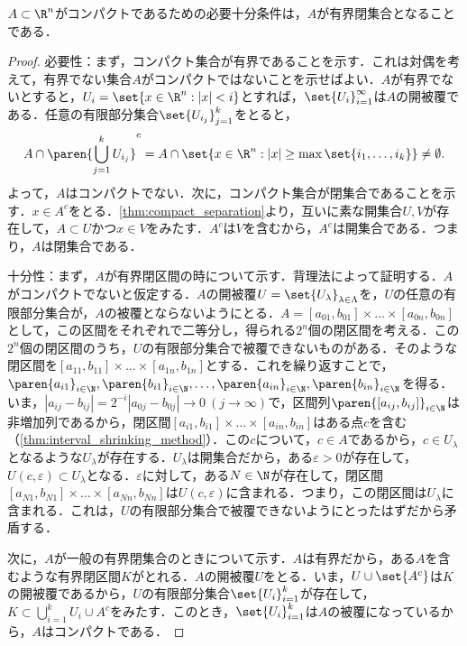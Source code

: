 \documentclass[a4paper,10pt]{ltjsarticle}
\begin{document}
\begin{MyTheorem}
  \(A \subset \R^n\)がコンパクトであるための必要十分条件は，\(A\)が有界閉集合となることである．
\end{MyTheorem}
\begin{proof}
  必要性：まず，コンパクト集合が有界であることを示す．これは対偶を考えて，有界でない集合\(A\)がコンパクトではないことを示せばよい．\(A\)が有界でないとすると，\(U_i = \set{x \in \R^n : |x| < i}\)とすれば，\(\set{U_i}_{i=1}^\infty\)は\(A\)の開被覆である．任意の有限部分集合\(\set{U_{i_j}}_{j=1}^k\)をとると，
  \[ A \cap \paren{\bigcup_{j=1}^k U_{i_j}}^c = A \cap \set{x \in \R^n : |x| \ge \max\set{i_1, \dots, i_k}} \ne \emptyset. \]
  よって，\(A\)はコンパクトでない．次に，コンパクト集合が閉集合であることを示す．\(x \in A^c\)をとる．\cref{thm:compact_separation}より，互いに素な開集合\(U, V\)が存在して，\(A \subset U\)かつ\(x \in V\)をみたす．\(A^c\)は\(V\)を含むから，\(A^c\)は開集合である．つまり，\(A\)は閉集合である．

  十分性：まず，\(A\)が有界閉区間の時について示す．背理法によって証明する．\(A\)がコンパクトでないと仮定する．\(A\)の開被覆\(U = \set{U_\lambda}_{\lambda \in \Lambda}\)を，\(U\)の任意の有限部分集合が，\(A\)の被覆とならないようにとる．\(A = [a_{01}, b_{01}] \times \dots \times [a_{0n}, b_{0n}]\)として，この区間をそれぞれで二等分し，得られる\(2^n\)個の閉区間を考える．この\(2^n\)個の閉区間のうち，\(U\)の有限部分集合で被覆できないものがある．そのような閉区間を\([a_{11}, b_{11}] \times \dots \times [a_{1n}, b_{1n}]\)とする．これを繰り返すことで，\(\paren{a_{i1}}_{i\in\N}, \paren{b_{i1}}_{i\in\N}, \dots, \paren{a_{in}}_{i\in\N}, \paren{b_{in}}_{i\in\N}\)を得る．いま，\(|a_{ij}-b_{ij}| = 2^{-i}|a_{0j}-b_{0j}| \to 0 \ (j \to \infty)\)で，区間列\(\paren{[a_{ij}, b_{ij}]}_{i\in\N}\)は非増加列であるから，閉区間\([a_{i1}, b_{i1}] \times \dots \times [a_{in}, b_{in}]\)はある点\(c\)を含む（\cref{thm:interval_shrinking_method}）．この\(c\)について，\(c \in A\)であるから，\(c \in U_\lambda\)となるような\(U_\lambda\)が存在する．\(U_\lambda\)は開集合だから，ある\(\varepsilon > 0\)が存在して，\( U(c, \varepsilon) \subset U_\lambda\)となる．\(\varepsilon\)に対して，ある\(N \in \N\)が存在して，閉区間\([a_{N1}, b_{N1}] \times \dots \times [a_{Nn}, b_{Nn}]\)は\(U(c, \varepsilon)\)に含まれる．つまり，この閉区間は\(U_\lambda\)に含まれる．これは，\(U\)の有限部分集合で被覆できないようにとったはずだから矛盾する．

  次に，\(A\)が一般の有界閉集合のときについて示す．\(A\)は有界だから，ある\(A\)を含むような有界閉区間\(K\)がとれる．\(A\)の開被覆\(U\)をとる．いま，\(U \cup \set{A^c}\)は\(K\)の開被覆であるから，\(U\)の有限部分集合\(\set{U_i}_{i=1}^k\)が存在して，\(K \subset \bigcup_{i=1}^k U_i \cup A^c\)をみたす．このとき，\(\set{U_i}_{i=1}^k\)は\(A\)の被覆になっているから，\(A\)はコンパクトである．
\end{proof}
\end{document}
